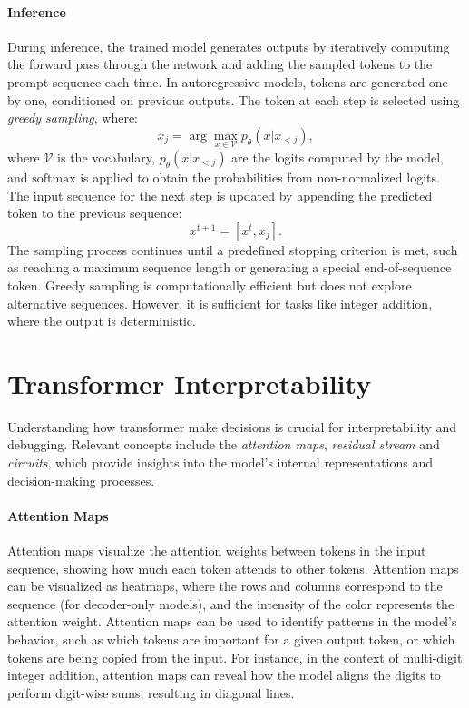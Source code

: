 \paragraph{Inference}
During inference, the trained model generates outputs by iteratively computing the forward pass through the network and adding the sampled tokens to the prompt sequence each time. In autoregressive models, tokens are generated one by one, conditioned on previous outputs. The token at each step is selected using \emph{greedy sampling}, where:
\begin{equation*}
    x_j = \arg\max_{x \in \mathcal{V}} p_{\theta}(x | x_{<j}),
\end{equation*}
where $\mathcal{V}$ is the vocabulary, $p_{\theta}(x | x_{<j})$ are the logits computed by the model, and $\text{softmax}$ is applied to obtain the probabilities from non-normalized logits. The input sequence for the next step is updated by appending the predicted token to the previous sequence:
\begin{equation*}
    x^{t+1} = [x^t, x_j].
\end{equation*}
The sampling process continues until a predefined stopping criterion is met, such as reaching a maximum sequence length or generating a special end-of-sequence token. Greedy sampling is computationally efficient but does not explore alternative sequences. However, it is sufficient for tasks like integer addition, where the output is deterministic.


\section{Transformer Interpretability}\label{sec:mech_interp}

Understanding how transformer make decisions is crucial for interpretability and debugging. Relevant concepts include the \emph{attention maps}, \emph{residual stream} and \emph{circuits}, which provide insights into the model's internal representations and decision-making processes.

\paragraph{Attention Maps}
Attention maps visualize the attention weights between tokens in the input sequence, showing how much each token attends to other tokens. Attention maps can be visualized as heatmaps, where the rows and columns correspond to the sequence (for decoder-only models), and the intensity of the color represents the attention weight. Attention maps can be used to identify patterns in the model's behavior, such as which tokens are important for a given output token, or which tokens are being copied from the input. For instance, in the context of multi-digit integer addition, attention maps can reveal how the model aligns the digits to perform digit-wise sums, resulting in diagonal lines.

